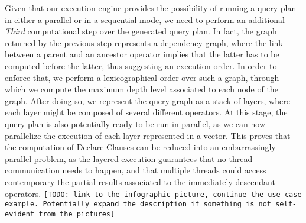 Given that our execution engine provides the possibility of running a query plan in either a parallel or in a sequential mode, we need to perform an additional \textit{Third} computational step over the generated query plan. In fact, the graph returned by the previous step represents a dependency graph, where the link between a parent and an ancestor operator implies that the latter has to be computed before the latter, thus suggesting an execution order. In order to enforce that, we perform a lexicographical order over such a graph, through which we compute the maximum depth level associated to each node of the graph. After doing so, we represent the query graph as a stack of layers, where each layer might be composed of several different operators. At this stage, the query plan is also potentially ready to be run in parallel, as we can now parallelize the execution of each layer represented in a vector. This proves that the computation of Declare Clauses can be reduced into an embarrassingly parallel problem, as the layered execution guarantees that no thread communication needs to happen, and that multiple threads could access contemporary the partial results associated to the immediately-descendant operators. \texttt{\color{red}[TODO: link to the infographic picture, continue the use case example. Potentially expand the description if something is not self-evident from the pictures]}

